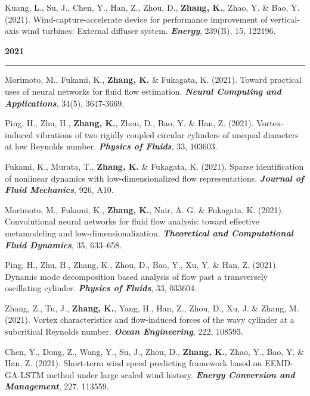 \documentclass[10pt]{article}
\begin{document}
{\begin{etaremune}
	\item Kuang, L., Su, J., Chen, Y., Han, Z., Zhou, D., \textbf{Zhang, K.}, Zhao, Y. \& Bao, Y. (2021). Wind-capture-accelerate device for performance improvement of vertical-axis wind turbines: External diffuser system. \textit{\textbf{Energy}}, 239(B), 15, 122196. 

\item [] {\bf \color{Blue} 2021 \rule{14.8cm}{0.2mm}}

  \item Morimoto, M., Fukami, K., \textbf{Zhang, K.} \& Fukagata, K. (2021). Toward practical uses of neural networks for fluid flow estimation. \textit{\textbf{Neural Computing and Applications}}, 34(5), 3647-3669.

  \item Ping, H., Zhu, H., \textbf{Zhang, K.}, Zhou, D., Bao, Y. \& Han, Z. (2021). Vortex-induced vibrations of two rigidly coupled circular cylinders of unequal diameters at low Reynolds number. \textit{\textbf{Physics of Fluids}}, 33, 103603. 
  
  \item Fukami, K., Murata, T., \textbf{Zhang, K.} \& Fukagata, K. (2021). Sparse identification of nonlinear dynamics with low-dimensionalized flow representations. \textit{\textbf{Journal of Fluid Mechanics}}, 926, A10.
  
  \item Morimoto, M., Fukami, K., \textbf{Zhang, K.}, Nair, A. G. \& Fukagata, K. (2021). Convolutional neural networks for fluid flow analysis: toward effective metamodeling and low-dimensionalization. \textit{\textbf{Theoretical and Computational Fluid Dynamics}}, 35, 633–658.

  \item Ping, H., Zhu, H., Zhang, K., Zhou, D., Bao, Y., Xu, Y. \& Han, Z. (2021). Dynamic mode decomposition based analysis of flow past a transversely oscillating cylinder. \textit{\textbf{Physics of Fluids}}, 33, 033604. 
  
  \item Zhang, Z., Tu, J., \textbf{Zhang, K.}, Yang, H., Han, Z., Zhou, D., Xu, J. \& Zhang, M. (2021). Vortex characteristics and flow-induced forces of the wavy cylinder at a subcritical Reynolds number. \textit{\textbf{Ocean Engineering}}, 222, 108593.
  
  \item Chen, Y., Dong, Z., Wang, Y., Su, J., Zhou, D., \textbf{Zhang, K.}, Zhao, Y., Bao, Y. \& Han, Z. (2021). Short-term wind speed predicting framework based on EEMD-GA-LSTM method under large scaled wind history. \textit{\textbf{Energy Conversion and Management}}, 227, 113559.
  

\end{etaremune}}
\end{document}
